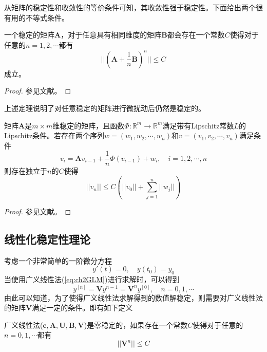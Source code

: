 从矩阵的稳定性和收敛性的等价条件可知，其收敛性强于稳定性。下面给出两个很有用的不等式条件。%
\begin{theorem}[稳定矩阵的鲁棒性]
一个稳定的矩阵$\bm{A}$，对于任意具有相同维度的矩阵$\bm{B}$都会存在一个常数$C$使得对于任意的$n=1,2,\cdots$都有
\begin{equation}
||\left(\bm{A}+\frac{1}{n}\bm{B}\right)^n||\le C
\end{equation}
成立。
\end{theorem}%
\begin{proof}
参见文献。
\end{proof}
上述定理说明了对任意稳定的矩阵进行微扰动后仍然是稳定的。

\begin{theorem}
矩阵$\bm{A}$是$m\times m$维稳定的矩阵，且函数$\Phi:\mathbb{R}^{m}\to\mathbb{R}^{m}$满足带有Lipschitz常数$L$的Lipschitz条件。若存在两个序列$w=(w_1,w_2,\cdots,w_n)$和$v=(v_1,v_2,\cdots,v_n)$满足条件
\begin{equation}
v_i=\bm{A}v_{i-1}+\frac{1}{n}\Phi(v_{i-1})+w_i,\quad i=1,2,\cdots,n
\end{equation}
则存在独立于$n$的$C$使得
\begin{equation}
||v_n||\le C\left(||v_0||+\sum_{j=1}^{n}||w_j||\right)
\end{equation}
\end{theorem}%
\begin{proof}
参见文献。
\end{proof}
\subsection{线性化稳定性理论}
考虑一个非常简单的一阶微分方程
\begin{equation}
y'(t)=0,\quad y(t_0)=y_0
\end{equation}
当使用广义线性法(\ref{eq:ch2GLM})进行求解时，可以得到
\begin{equation}
y^{[n]}=\bm{V}y^{n-1}=\bm{V}^ny^{[0]},\quad n=0,1,\cdots
\end{equation}
由此可以知道，为了使得广义线性法求解得到的数值解稳定，则需要对广义线性法的矩阵$\bm{V}$满足一定的条件。即有如下定义
\begin{definition}[零稳定性]
广义线性法($\bm{c},\bm{A},\bm{U},\bm{B},\bm{V}$)是零稳定的\cite{Jackiewicz2009a,Burrage1995a,Butcher2016a}，如果存在一个常数$C$使得对于任意的$n=0,1,\cdots$都有
\begin{equation}
||\bm{V}^n||\le C
\end{equation}
\end{definition}%

